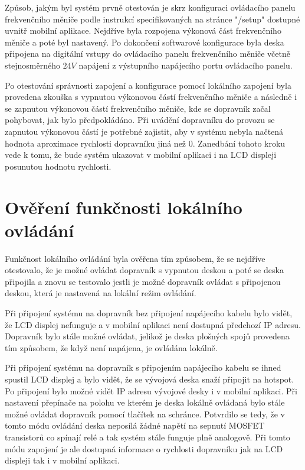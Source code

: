 Způsob, jakým byl systém prvně otestován je skrz konfiguraci ovládacího panelu frekvenčního měniče podle instrukcí specifikovaných na stránce "/setup" dostupné uvnitř mobilní aplikace. Nejdříve byla rozpojena výkonová část frekvenčního měniče a poté byl nastavený. Po dokončení softwarové konfigurace byla deska připojena na digitální vstupy do ovládacího panelu frekvenčního měniče včetně stejnosměrného $24V$ napájení z výstupního napájecího portu ovládacího panelu.

Po otestování správnosti zapojení a konfigurace pomocí lokálního zapojení byla provedena zkouška s vypnutou výkonovou částí frekvenčního měniče a následně i se zapnutou výkonovou částí frekvenčního měniče, kde se dopravník začal pohybovat, jak bylo předpokládáno. Při uvádění dopravníku do provozu se zapnutou výkonovou částí je potřebné zajistit, aby v systému nebyla načtená hodnota aproximace rychlosti dopravníku jiná než 0. Zanedbání tohoto kroku vede k tomu, že bude systém ukazovat v mobilní aplikaci i na LCD displeji posunutou hodnotu rychlosti.

\oldtext

\section{Ověření funkčnosti lokálního ovládání}

Funkčnost lokálního ovládání byla ověřena tím způsobem, že se nejdříve otestovalo, že je možné ovládat dopravník s vypnutou deskou a poté se deska připojila a znovu se testovalo jestli je možné dopravník ovládat s připojenou deskou, která je nastavená na lokální režim ovládání.

Při připojení systému na dopravník bez připojení napájecího kabelu bylo vidět, že LCD displej nefunguje a v mobilní aplikaci není dostupná předchozí IP adresu. Dopravník bylo stále možné ovládat, jelikož je deska plošných spojů provedena tím způsobem, že když není napájena, je ovládána lokálně.

Při připojení systému na dopravník s připojením napájecího kabelu se ihned spustil LCD displej a bylo vidět, že se vývojová deska snaží připojit na hotspot. Po připojení bylo možné vidět IP adresu vývojové desky i v mobilní aplikaci. Při nastavení přepínače na polohu ve kterém je deska lokálně ovládaná bylo stále možné ovládat dopravník pomocí tlačítek na schránce. Potvrdilo se tedy, že v tomto módu ovládání deska neposílá žádné napětí na sepnutí MOSFET transistorů co spínají relé a tak systém stále funguje plně analogově. Při tomto módu zapojení je ale dostupná informace o rychlosti dopravníku jak na LCD displeji tak i v mobilní aplikaci.

